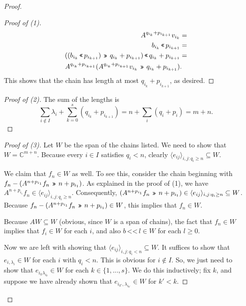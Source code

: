\documentclass[12pt,psamsfonts]{article}
\newcommand{\leftshift}{\,\texttt{<<}\,}
\newcommand{\rightshift}{\mathbin{\rotatebox[origin=c]{180}{\leftshift}}}
\begin{document}
\begin{proof}
\begin{proof}[Proof of (1)]
\begin{align*}
            A^{q_{i_k} + p_{i_{k + 1}}} v_{i_k} & = \\
            b_{i_k} \leftshift p_{i_{k + 1}} & = \\
            ((b_{i_k} \leftshift p_{i_{k + 1}}) \rightshift q_{i_k} + p_{i_{k + 1}}) \leftshift q_{i_k} + p_{i_{k + 1}} & = \\
            A^{q_{i_k} + p_{i_{k + 1}}}(A^{q_{i_k} + p_{i_{k + 1}}} v_{i_k} \rightshift q_{i_k} + p_{i_{k + 1}}) & .
        \end{align*}
        This shows that the chain has length at most \(q_{i_k} + p_{i_{k + 1}}\), as desired.
    \end{proof}
    \begin{proof}[Proof of (2)]
        The sum of the lengths is
        \[\sum_{i \notin I} \lambda_i + \sum_{k = 0}^s (q_{i_k} + p_{i_{k + 1}}) = n + \sum_i (q_i + p_i) = m + n.\]
    \end{proof}
    \begin{proof}[Proof of (3)]
        Let \(W\) be the span of the chains listed.
        We need to show that \(W = \mathbb{C}^{m + n}\).
        Because every \(i \in I\) satisfies \(q_i < n\), clearly \(\langle e_{ij}\rangle_{i,j : q_i \geq n} \subseteq W\).
        \par We claim that \(f_n \in W\) as well.
        To see this, consider the chain beginning with \(f_n - (A^{n + p_{i_1}} f_n \rightshift n + p_{i_1})\).
        As explained in the proof of (1), we have \(A^{n + p_{i_1}} f_n \in \langle e_{ij}\rangle_{i,j : q_i \geq n}\).
        Consequently, \((A^{n + p_{i_1}} f_n \rightshift n + p_{i_1}) \in \langle e_{ij} \rangle_{i,j : q_i \geq n} \subseteq W\).
        Because \(f_n - (A^{n + p_{i_1}} f_n \rightshift n + p_{i_1}) \in W\), this implies that \(f_n \in W\).
        \par Because \(AW \subseteq W\) (obvious, since \(W\) is a span of chains), the fact that \(f_n \in W\) implies that \(f_i \in W\) for each \(i\), and also \(b \leftshift l \in W\) for each \(l \geq 0\).
        \par Now we are left with showing that \(\langle e_{ij} \rangle_{i,j : q_i < n} \subseteq W\).
        It suffices to show that \(e_{i, \lambda_i} \in W\) for each \(i\) with \(q_i < n\).
        This is obvious for \(i \notin I\).
        So, we just need to show that \(e_{i_k\lambda_{i_k}} \in W\) for each \(k \in \{1, ..., s\}\).
        We do this inductively; fix \(k\), and suppose we have already shown that \(e_{i_{k'}, \lambda_{i_{k'}}} \in W\) for \(k' < k\).

\end{proof}
\end{proof}
\end{document}
